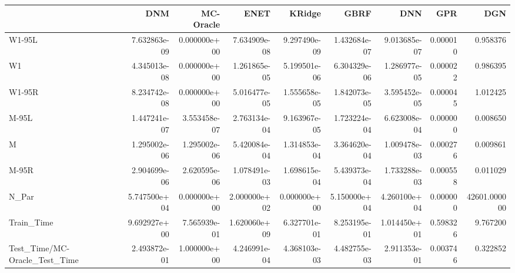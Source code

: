 \begin{tabular}{lrrrrrrrr}
\toprule
{} &           DNM &     MC-Oracle &          ENET &        KRidge &          GBRF &           DNN &       GPR &           DGN \\
\midrule
W1-95L                        &  7.632863e-09 &  0.000000e+00 &  7.634909e-08 &  9.297490e-09 &  1.432684e-07 &  9.013685e-07 &  0.000010 &      0.958376 \\
W1                            &  4.345013e-08 &  0.000000e+00 &  1.261865e-05 &  5.199501e-06 &  6.304329e-06 &  1.286977e-05 &  0.000022 &      0.986395 \\
W1-95R                        &  8.234742e-08 &  0.000000e+00 &  5.016477e-05 &  1.555658e-05 &  1.842073e-05 &  3.595452e-05 &  0.000045 &      1.012425 \\
M-95L                         &  1.447241e-07 &  3.553458e-07 &  2.763134e-04 &  9.163967e-05 &  1.723224e-04 &  6.623008e-04 &  0.000000 &      0.008650 \\
M                             &  1.295002e-06 &  1.295002e-06 &  5.420084e-04 &  1.314853e-04 &  3.364620e-04 &  1.009478e-03 &  0.000276 &      0.009861 \\
M-95R                         &  2.904699e-06 &  2.620595e-06 &  1.078491e-03 &  1.698615e-04 &  5.439373e-04 &  1.733288e-03 &  0.000558 &      0.011029 \\
N\_Par                         &  5.747500e+04 &  0.000000e+00 &  2.000000e+02 &  0.000000e+00 &  5.150000e+04 &  4.260100e+04 &  0.000000 &  42601.000000 \\
Train\_Time                    &  9.692927e+00 &  7.565939e-01 &  1.620060e+09 &  6.327701e-01 &  8.253195e-01 &  1.014450e+01 &  0.598326 &      9.767200 \\
Test\_Time/MC-Oracle\_Test\_Time &  2.493872e-01 &  1.000000e+00 &  4.246991e-04 &  4.368103e-03 &  4.482755e-03 &  2.911353e-01 &  0.003746 &      0.322852 \\
\bottomrule
\end{tabular}
